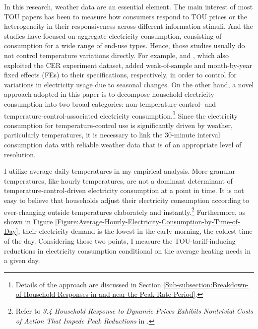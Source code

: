 In this research, weather data are an essential element. The main interest of most TOU papers has been to measure how consumers respond to TOU prices or the heterogeneity in their responsiveness across different information stimuli. And the studies have focused on aggregate electricity consumption, consisting of consumption for a wide range of end-use types. Hence, those studies usually do not control temperature variations directly. For example, \cite{The-Effect-of-Information-on-TOU-Electricity-Use:An-Irish-Residential-Study_Pon_2017} and \cite{Peaking-Interest:How-Awareness-Drives-the-Effectiveness-of-Time-of-Use-Electricity-Pricing_Prest_2020}, which also exploited the CER experiment dataset, added weak-of-sample and month-by-year fixed effects (FEs) to their specifications, respectively, in order to control for variations in electricity usage due to seasonal changes. On the other hand, a novel approach adopted in this paper is to decompose household electricity consumption into two broad categories: non-temperature-control- and temperature-control-associated electricity consumption.\footnote{Details of the approach are discussed in Section \ref{Sub-subsection:Breakdown-of-Household-Responses-in-and-near-the-Peak-Rate-Period}.} Since the electricity consumption for temperature-control use is significantly driven by weather, particularly temperatures, it is necessary to link the 30-minute interval consumption data with reliable weather data that is of an appropriate level of resolution. 

I utilize average daily temperatures in my empirical analysis. More granular temperatures, like hourly temperatures, are not a dominant determinant of temperature-control-driven electricity consumption at a point in time. It is not easy to believe that households adjust their electricity consumption according to ever-changing outside temperatures elaborately and instantly.\footnote{Refer to \textit{3.4 Household Response to Dynamic Prices Exhibits Nontrivial Costs of Action That Impede Peak Reductions} in \cite{Household-Responses-to-Time-Varying-Electricity-Prices_Harding-and-Sexton_2017}.} Furthermore, as shown in Figure \ref{Figure:Average-Hourly-Electricity-Consumption-by-Time-of-Day}, their electricity demand is the lowest in the early morning, the coldest time of the day. Considering those two points, I measure the TOU-tariff-inducing reductions in electricity consumption conditional on the average heating needs in a given day. 

